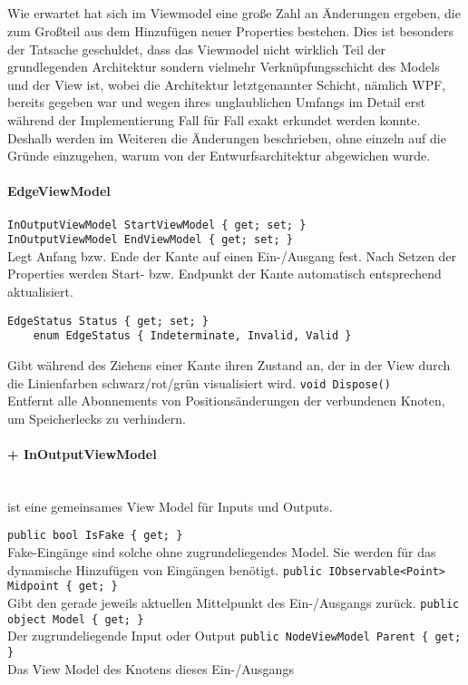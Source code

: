 \subsection{}

Wie erwartet hat sich im Viewmodel eine große Zahl an Änderungen ergeben, die zum Großteil aus dem Hinzufügen neuer Properties bestehen. Dies ist besonders der Tatsache geschuldet, dass das Viewmodel nicht wirklich Teil der grundlegenden Architektur sondern vielmehr Verknüpfungsschicht des Models und der View ist, wobei die Architektur letztgenannter Schicht, nämlich WPF, bereits gegeben war und wegen ihres unglaublichen Umfangs im Detail erst während der Implementierung Fall für Fall exakt erkundet werden konnte. Deshalb werden im Weiteren die Änderungen beschrieben, ohne einzeln auf die Gründe einzugehen, warum von der Entwurfsarchitektur abgewichen wurde.

\paragraph{EdgeViewModel}
\begin{itemize}
	\add \verb!InOutputViewModel StartViewModel { get; set; }! \\
	     \verb!InOutputViewModel EndViewModel { get; set; }! \\
	Legt Anfang bzw. Ende der Kante auf einen Ein-/Ausgang fest. Nach Setzen der Properties werden Start- bzw. Endpunkt der Kante automatisch entsprechend aktualisiert.
	\add \begin{verbatim}EdgeStatus Status { get; set; }
	enum EdgeStatus { Indeterminate, Invalid, Valid }
	\end{verbatim}
	Gibt während des Ziehens einer Kante ihren Zustand an, der in der View durch die Linienfarben schwarz/rot/grün visualisiert wird.
	\add \verb!void Dispose()! \\
	Entfernt alle Abonnements von Positionsänderungen der verbundenen Knoten, um Speicherlecks zu verhindern.
\end{itemize}

\paragraph{+ InOutputViewModel}~\\
 ist eine gemeinsames View Model für Inputs und Outputs.
\begin{itemize}
	\add \verb!public bool IsFake { get; }! \\
	Fake-Eingänge sind solche ohne zugrundeliegendes Model. Sie werden für das dynamische Hinzufügen von Eingängen benötigt.
	\add \verb!public IObservable<Point> Midpoint { get; }! \\
	Gibt den gerade jeweils aktuellen Mittelpunkt des Ein-/Ausgangs zurück.
	\add \verb!public object Model { get; }! \\
	Der zugrundeliegende Input oder Output
	\add \verb!public NodeViewModel Parent { get; }! \\
	Das View Model des Knotens dieses Ein-/Ausgangs
\end{itemize}

\subsection{}

